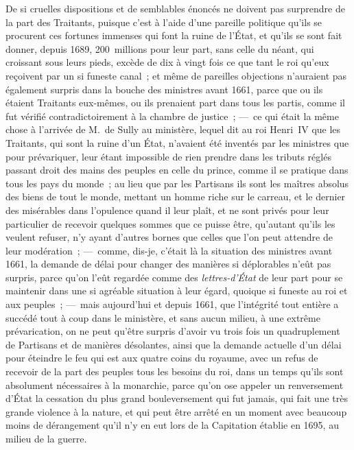 \documentclass[french,twoside]{book} %
\begin{document}
De si cruelles dispositions et de semblables énoncés ne doivent pas surprendre de la part des Traitants, puisque c’est à l’aide d’une pareille politique qu’ils se procurent ces fortunes immenses qui font la ruine de l’État, et qu’ils se sont fait donner, depuis 1689, 200 millions pour leur part, sans celle du néant, qui croissant sous leurs pieds, excède de dix à vingt fois ce que tant le roi qu’eux reçoivent par un si funeste canal ; et même de pareilles objections n’auraient pas également surpris dans la bouche des ministres avant 1661, parce que ou ils étaient Traitants eux-mêmes, ou ils prenaient part dans tous les partis, comme il fut vérifié contradictoirement à la chambre de justice ; — ce qui était la même chose à l’arrivée de M. de Sully au ministère, lequel dit au roi Henri IV que les Traitants, qui sont la ruine d’un État, n’avaient été inventés par les ministres que pour prévariquer, leur étant impossible de rien prendre dans les tributs réglés passant droit des mains des peuples en celle du prince, comme il se pratique dans tous les pays du monde ; au lieu que par les Partisans ils sont les maîtres absolus des biens de tout le monde, mettant un homme riche sur le carreau, et le dernier des misérables dans l’opulence quand il leur plaît, et ne sont privés pour leur particulier de recevoir quelques sommes que ce puisse être, qu’autant qu’ils les veulent refuser, n’y ayant d’autres bornes que celles que l’on peut attendre de leur modération ; — comme, dis-je, c’était là la situation des ministres avant 1661, la demande de délai pour changer des manières si déplorables n’eût pas surpris, parce qu’on l’eût regardée comme des {\itshape lettres-d’État} de leur part pour se maintenir dans une si agréable situation à leur égard, quoique si funeste au roi et aux peuples ; — mais aujourd’hui et depuis 1661, que l’intégrité tout entière a succédé tout à coup dans le ministère, et sans aucun milieu, à une extrême prévarication, on ne peut qu’être surpris d’avoir vu trois fois un quadruplement de Partisans et de manières désolantes, ainsi que la demande actuelle d’un délai pour éteindre le feu qui est aux quatre coins du royaume, avec un refus de recevoir de la part des peuples tous les besoins du roi, dans un temps qu’ils sont absolument nécessaires à la monarchie, parce qu’on ose appeler un renversement d’État la cessation du plus grand bouleversement qui fut jamais, qui fait une très grande violence à la nature, et qui peut être arrêté en un moment avec beaucoup moins de dérangement qu’il n’y en eut lors de la Capitation établie en 1695, au milieu de la guerre.\par
\end{document}
